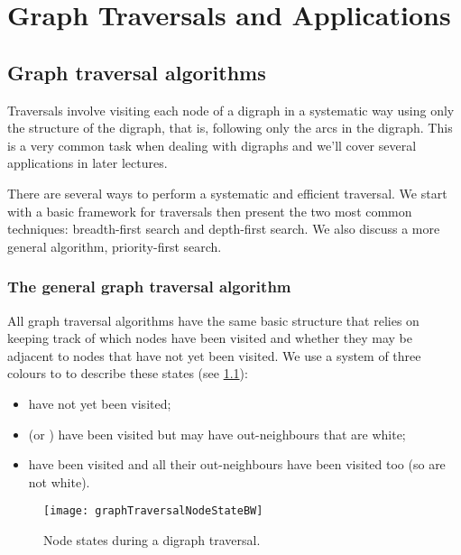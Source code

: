 \part{Graph Traversals and Applications}
\label{ch:traversal}


\chapter{Graph traversal algorithms}

Traversals involve visiting each node of a digraph in a systematic way using only the structure of the digraph, that is, following only the arcs in the digraph. 
This is a very common task when dealing with digraphs and we'll cover several applications in later lectures.

There are several ways to perform a systematic and efficient traversal.  
We start with a basic framework for traversals then present the
two most common techniques: breadth-first search and depth-first search.
We also discuss a more general algorithm, priority-first search. 

\section{The general graph traversal algorithm}
\label{sec:trav}

All graph traversal algorithms  have the same basic structure  that relies on keeping track of which nodes have been visited and whether they may be adjacent to nodes that have not yet been visited. We use a system of three colours to to describe these states (see  \cref{fig:travcols}):
\begin{itemize} 
\item {} have not yet been visited;
\item {} (or ) have been visited but may have 
 out-neighbours that are white;
\item {} have been visited and all their out-neighbours have been visited too (so are not white). 
\end{itemize}
\begin{figure}
  \centering
  \texttt{[image: graphTraversalNodeStateBW]}
  \caption{Node states during a digraph traversal.}
  \label{fig:travcols}
\end{figure}


